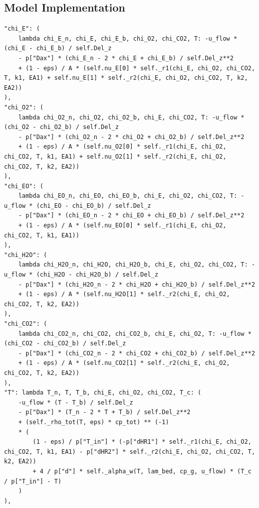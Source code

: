 \subsection{Model Implementation}
\begin{lstlisting}[frame=single]
"chi_E": (
    lambda chi_E_n, chi_E, chi_E_b, chi_O2, chi_CO2, T: -u_flow * (chi_E - chi_E_b) / self.Del_z
    - p["Dax"] * (chi_E_n - 2 * chi_E + chi_E_b) / self.Del_z**2
    + (1 - eps) / A * (self.nu_E[0] * self._r1(chi_E, chi_O2, chi_CO2, T, k1, EA1) + self.nu_E[1] * self._r2(chi_E, chi_O2, chi_CO2, T, k2, EA2))
),
"chi_O2": (
    lambda chi_O2_n, chi_O2, chi_O2_b, chi_E, chi_CO2, T: -u_flow * (chi_O2 - chi_O2_b) / self.Del_z
    - p["Dax"] * (chi_O2_n - 2 * chi_O2 + chi_O2_b) / self.Del_z**2
    + (1 - eps) / A * (self.nu_O2[0] * self._r1(chi_E, chi_O2, chi_CO2, T, k1, EA1) + self.nu_O2[1] * self._r2(chi_E, chi_O2, chi_CO2, T, k2, EA2))
),
"chi_EO": (
    lambda chi_EO_n, chi_EO, chi_EO_b, chi_E, chi_O2, chi_CO2, T: -u_flow * (chi_EO - chi_EO_b) / self.Del_z
    - p["Dax"] * (chi_EO_n - 2 * chi_EO + chi_EO_b) / self.Del_z**2
    + (1 - eps) / A * (self.nu_EO[0] * self._r1(chi_E, chi_O2, chi_CO2, T, k1, EA1))
),
"chi_H2O": (
    lambda chi_H2O_n, chi_H2O, chi_H2O_b, chi_E, chi_O2, chi_CO2, T: -u_flow * (chi_H2O - chi_H2O_b) / self.Del_z
    - p["Dax"] * (chi_H2O_n - 2 * chi_H2O + chi_H2O_b) / self.Del_z**2
    + (1 - eps) / A * (self.nu_H2O[1] * self._r2(chi_E, chi_O2, chi_CO2, T, k2, EA2))
),
"chi_CO2": (
    lambda chi_CO2_n, chi_CO2, chi_CO2_b, chi_E, chi_O2, T: -u_flow * (chi_CO2 - chi_CO2_b) / self.Del_z
    - p["Dax"] * (chi_CO2_n - 2 * chi_CO2 + chi_CO2_b) / self.Del_z**2
    + (1 - eps) / A * (self.nu_CO2[1] * self._r2(chi_E, chi_O2, chi_CO2, T, k2, EA2))
),
"T": lambda T_n, T, T_b, chi_E, chi_O2, chi_CO2, T_c: (
    -u_flow * (T - T_b) / self.Del_z
    - p["Dax"] * (T_n - 2 * T + T_b) / self.Del_z**2
    + (self._rho_tot(T, eps) * cp_tot) ** (-1)
    * (
        (1 - eps) / p["T_in"] * (-p["dHR1"] * self._r1(chi_E, chi_O2, chi_CO2, T, k1, EA1) - p["dHR2"] * self._r2(chi_E, chi_O2, chi_CO2, T, k2, EA2))
        + 4 / p["d"] * self._alpha_w(T, lam_bed, cp_g, u_flow) * (T_c / p["T_in"] - T)
    )
),
\end{lstlisting}